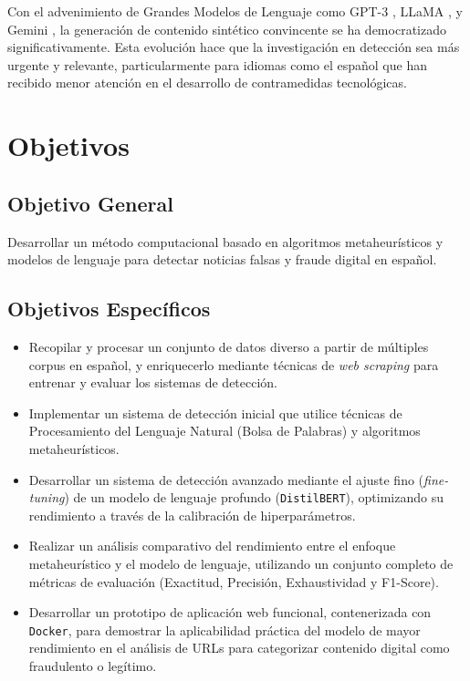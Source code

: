 Con el advenimiento de Grandes Modelos de Lenguaje como GPT-3 \cite{brown2020language}, LLaMA \cite{touvron2023llama}, y Gemini \cite{gemini2023family}, la generación de contenido sintético convincente se ha democratizado significativamente. Esta evolución hace que la investigación en detección sea más urgente y relevante, particularmente para idiomas como el español que han recibido menor atención en el desarrollo de contramedidas tecnológicas.

\section{Objetivos}

\subsection*{Objetivo General}
Desarrollar un método computacional basado en algoritmos metaheurísticos y modelos de lenguaje para detectar noticias falsas y fraude digital en español.

\subsection*{Objetivos Específicos}

\begin{itemize}
    \item Recopilar y procesar un conjunto de datos diverso a partir de múltiples corpus en español, y enriquecerlo mediante técnicas de \textit{web scraping} para entrenar y evaluar los sistemas de detección.
    
    \item Implementar un sistema de detección inicial que utilice técnicas de Procesamiento del Lenguaje Natural (Bolsa de Palabras) y algoritmos metaheurísticos.
    
    \item Desarrollar un sistema de detección avanzado mediante el ajuste fino (\textit{fine-tuning}) de un modelo de lenguaje profundo (\texttt{DistilBERT}), optimizando su rendimiento a través de la calibración de hiperparámetros.
    
    \item Realizar un análisis comparativo del rendimiento entre el enfoque metaheurístico y el modelo de lenguaje, utilizando un conjunto completo de métricas de evaluación (Exactitud, Precisión, Exhaustividad y F1-Score).
    
    \item Desarrollar un prototipo de aplicación web funcional, contenerizada con \texttt{Docker}, para demostrar la aplicabilidad práctica del modelo de mayor rendimiento en el análisis de URLs para categorizar contenido digital como fraudulento o legítimo.
\end{itemize}

